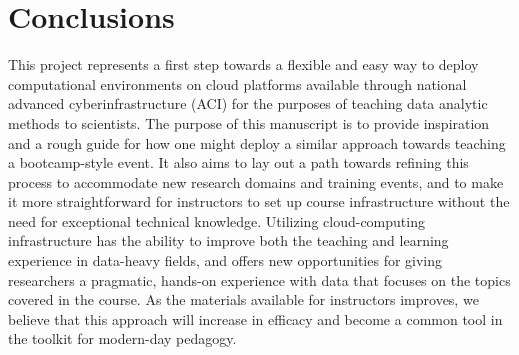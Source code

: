 \section{Conclusions}

This project represents a first step towards a flexible and easy way to deploy
computational environments on cloud platforms available through national
advanced cyberinfrastructure (ACI) for the purposes of teaching data analytic
methods to scientists. The purpose of this manuscript is to provide inspiration
and a rough guide for how one might deploy a similar approach towards teaching a
bootcamp-style event. It also aims to lay out a path towards refining this
process to accommodate new research domains and training events, and to make it
more straightforward for instructors to set up course infrastructure without the
need for exceptional technical knowledge. Utilizing cloud-computing
infrastructure has the ability to improve both the teaching and learning
experience in data-heavy fields, and offers new opportunities for giving
researchers a pragmatic, hands-on experience with data that focuses on the
topics covered in the course. As the materials available for instructors
improves, we believe that this approach will increase in efficacy and become a
common tool in the toolkit for modern-day pedagogy.
